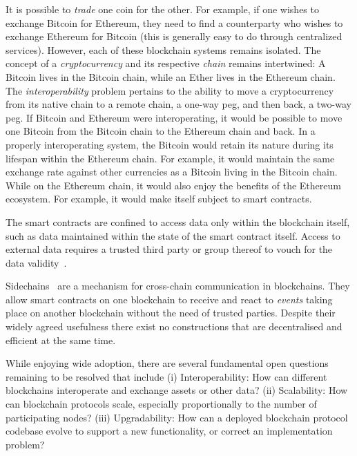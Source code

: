 It is possible to \emph{trade} one coin for the other. For example, if one
wishes to exchange Bitcoin for Ethereum, they need to find a counterparty who
wishes to exchange Ethereum for Bitcoin (this is generally easy to do through
centralized services). However, each of these blockchain systems remains
isolated. The concept of a \emph{cryptocurrency} and its respective \emph{chain}
remains intertwined: A Bitcoin lives in the Bitcoin chain, while an Ether lives
in the Ethereum chain. The \emph{interoperability} problem pertains to the
ability to move a cryptocurrency from its native chain to a remote chain,
a one-way peg, and then back, a two-way
peg. If Bitcoin and Ethereum were interoperating, it would be
possible to move one Bitcoin from the Bitcoin chain to the Ethereum chain and
back. In a properly interoperating system, the Bitcoin would retain its nature
during its lifespan within the Ethereum chain. For example, it would maintain
the same exchange rate against other currencies as a Bitcoin living in the
Bitcoin chain. While on the Ethereum chain, it would also enjoy the benefits of
the Ethereum ecosystem. For example, it would make itself subject to smart
contracts.


The smart contracts are confined to access data only within the blockchain
itself, such as data maintained within the state of the smart contract itself.
Access to external data
requires a trusted third party or group thereof to vouch for the data
validity~\cite{towncrier}.


Sidechains~\cite{sidechains} are a mechanism for cross-chain communication in
blockchains. They allow smart contracts on one blockchain to receive and
react to \textit{events} taking place on another blockchain without the need
of trusted parties. Despite their widely agreed usefulness
there exist no constructions that are decentralised and efficient at the same
time.


While enjoying wide adoption,
there  are several fundamental open questions remaining to be resolved
that include (i)
         Interoperability:
           How can different blockchains interoperate and exchange
           assets or other data?
(ii)  Scalability:
           How can blockchain protocols scale, especially proportionally to the number of           participating nodes?
(iii)
         Upgradability:
           How can a deployed blockchain protocol codebase evolve to support a new
           functionality, or correct an implementation problem?

